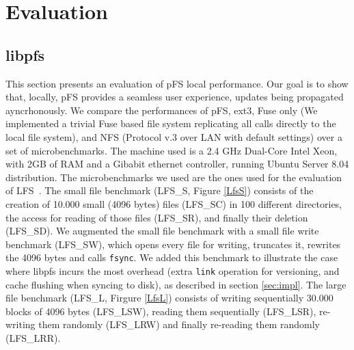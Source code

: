 
\section{Evaluation}
\label{sec:eval}


\subsection{libpfs}

This section presents an evaluation of pFS local performance. Our goal
is to show that, locally, pFS provides a seamless user experience,
updates being propagated ayncrhonously. We compare the performances of
pFS, ext3, Fuse only (We implemented a trivial Fuse based file system
replicating all calls directly to the local file system), and NFS
(Protocol v.3 over LAN with default settings) over a set of
microbenchmarks. The machine used is a 2.4 GHz Dual-Core Intel Xeon,
with 2GB of RAM and a Gibabit ethernet controller, running Ubuntu
Server 8.04 distribution. The microbenchmarks we used are the ones
used for the evaluation of LFS~\cite{rosenblum:lfs}. The small file
benchmark (LFS\_S, Figure \ref{LfsS}) consists of the creation of
10.000 small (4096 bytes) files (LFS\_SC) in 100 different
directories, the access for reading of those files (LFS\_SR), and
finally their deletion (LFS\_SD). We augmented the small file
benchmark with a small file write benchmark (LFS\_SW), which opens
every file for writing, truncates it, rewrites the 4096 bytes and
calls {\tt fsync}.  We added this benchmark to illustrate the case
where libpfs incurs the most overhead (extra {\tt link} operation
for versioning, and cache flushing when syncing to disk), as
described in section \ref{sec:impl}. The large file benchmark (LFS\_L,
Firgure \ref{LfsL}) consists of writing sequentially 30.000 blocks of
4096 bytes (LFS\_LSW), reading them sequentially (LFS\_LSR),
re-writing them randomly (LFS\_LRW) and finally re-reading them
randomly (LFS\_LRR).

